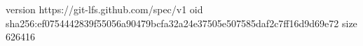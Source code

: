version https://git-lfs.github.com/spec/v1
oid sha256:ef0754442839f55056a90479bcfa32a24e37505e507585daf2c7ff16d9d69e72
size 626416
